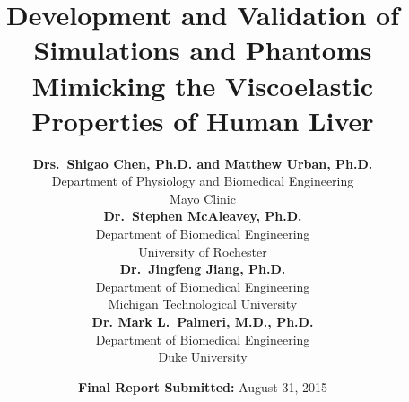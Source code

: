 \documentclass[11pt]{article}
\title{Development and Validation of Simulations and Phantoms Mimicking the
    Viscoelastic Properties of Human Liver}
\author{\textbf{Drs.\ Shigao Chen, Ph.D. and Matthew Urban, Ph.D.}\\
        Department of Physiology and Biomedical Engineering\\
        Mayo Clinic \vspace*{0.1in}\\
        \textbf{Dr.\ Stephen McAleavey, Ph.D.}\\
        Department of Biomedical Engineering\\
        University of Rochester \vspace*{0.1in}\\
        \textbf{Dr.\ Jingfeng Jiang, Ph.D.}\\
        Department of Biomedical Engineering\\
        Michigan Technological University \vspace*{0.1in}\\
        \textbf{Dr. Mark L.\ Palmeri, M.D., Ph.D.}\\
        Department of Biomedical Engineering\\
        Duke University}
\date{\textbf{Final Report Submitted:} August 31, 2015}
\begin{document}
\maketitle

\tableofcontents

\pagebreak












\end{document}
